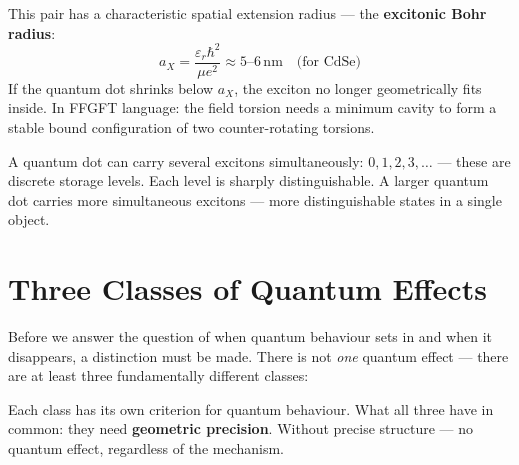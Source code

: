 This pair has a characteristic spatial extension radius
--- the \textbf{excitonic Bohr radius}:
\begin{equation}
  a_X = \frac{\varepsilon_r \hbar^2}{\mu e^2} \approx 5\text{--}6\,\text{nm}
  \quad \text{(for CdSe)}
\end{equation}
If the quantum dot shrinks below $a_X$, the exciton no longer
geometrically fits inside. In FFGFT language: the field torsion
needs a minimum cavity to form a stable bound configuration
of two counter-rotating torsions.

A quantum dot can carry several excitons simultaneously:
$0, 1, 2, 3, \ldots$ --- these are discrete storage levels.
Each level is sharply distinguishable. A larger quantum dot
carries more simultaneous excitons --- more distinguishable states
in a single object.

\section{Three Classes of Quantum Effects}
\label{sec:three-classes}

Before we answer the question of when quantum behaviour
sets in and when it disappears, a distinction must be made.
There is not \emph{one} quantum effect ---
there are at least three fundamentally different classes:

\begin{center}
\end{center}

Each class has its own criterion for quantum behaviour.
What all three have in common: they need \textbf{geometric
precision}. Without precise structure --- no quantum effect,
regardless of the mechanism.

